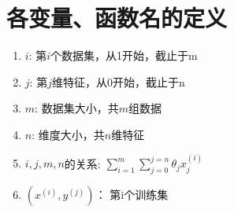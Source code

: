 \section{各变量、函数名的定义}
\begin{enumerate}
	\item $i$: 第$i$个数据集，从1开始，截止于m
	\item $j$: 第$j$维特征，从0开始，截止于n
	\item $m$: 数据集大小，共$m$组数据
	\item $n$: 维度大小，共$n$维特征
	\item $i, j, m, n$的关系: $\sum_{i=1}^{m}\sum_{j=0}^{j=n}{\theta_{j}x_j^{(i)}}$
	\item $(x^{(i)}, y^{(j)})$： 第i个训练集
\end{enumerate}